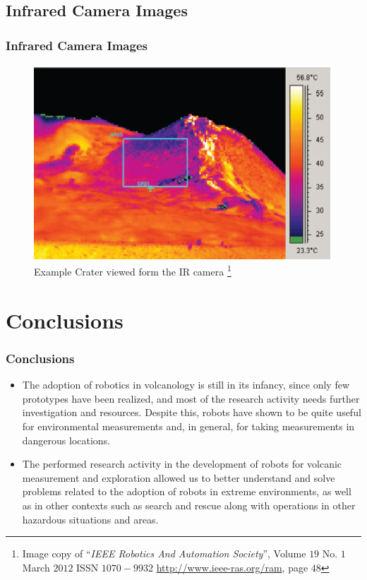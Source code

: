 \documentclass[xcolor=svgnames]{beamer}
\begin{document}
\subsection{Infrared Camera Images}
\begin{frame}
\frametitle{Infrared Camera Images}
  \begin{figure}[H]
	\centering
		\includegraphics[scale=0.48]{infra.png}
	\caption{Example Crater viewed form the IR camera \footnote{Image copy of ``\textit{IEEE Robotics And Automation Society}'', Volume $19$ No. $1$ March $2012$ ISSN $1070-9932$ \url{http://www.ieee-ras.org/ram}, page $48$}}
	\label{fig2}
\end{figure}
\end{frame}

\section{Conclusions}
\begin{frame}
    \frametitle{Conclusions}
      \begin{itemize}
       \item The adoption of robotics in volcanology is still in its infancy, since only few prototypes have been realized, and most of the research activity needs further investigation and resources. Despite this, robots have shown to be quite useful for environmental measurements and, in general, for taking measurements in dangerous locations. \pause
       \item The performed research activity in the development of robots for volcanic measurement and exploration allowed us to better understand and solve problems related to the adoption of robots in extreme environments, as well as in other contexts such as search and rescue along with operations in other hazardous situations and areas.
      \end{itemize}
\end{frame}
\end{document}
